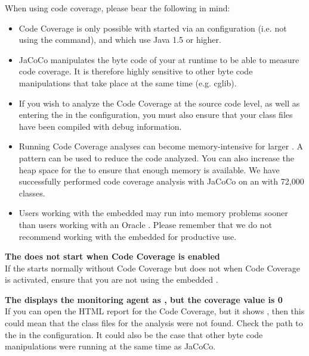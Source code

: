 When using code coverage, please bear the following in mind:

\begin{itemize}
\item Code Coverage is only possible with  \gdauts{} started via an \gdaut{} configuration  (i.e. not using the  command), and which use Java 1.5 or higher.
\item JaCoCo manipulates the byte code of your \gdaut{} at runtime to be able to measure code coverage. It is therefore highly sensitive to other byte code manipulations that take place at the same time (e.g. cglib).
\item If you wish to analyze the Code Coverage at the source code level, as well as entering the  in the \gdaut{} configuration, you must also ensure that your class files have been compiled with debug information.
\item Running Code Coverage analyses can become memory-intensive for larger \gdauts{}. A pattern can be used to reduce the code analyzed. You can also increase the heap space for the \ite{} to ensure that enough memory is available. We have successfully performed code coverage analysis with JaCoCo on an \gdaut{} with 72,000 classes.  
\item Users working with the embedded \gddb{} may run into memory problems sooner than users working with an Oracle \gddb{}. Please remember that we do not recommend working with the embedded \gddb{} for productive use. 
\end{itemize}


\textbf{The \gdaut{} does not start when Code Coverage is enabled}\\
If the \gdaut{} starts normally without Code Coverage but does not when Code Coverage is activated, ensure that you are not using the embedded \gdagent{}.

\textbf{The \gdtestsummaryview{} displays the monitoring agent as , but the coverage value is 0}\\
If you can open the HTML report for the Code Coverage, but it shows , then this could mean that the class files for the analysis were not found. Check the path to the  in the \gdaut{} configuration. 
It could also be the case that other byte code manipulations were running at the same time as JaCoCo.







